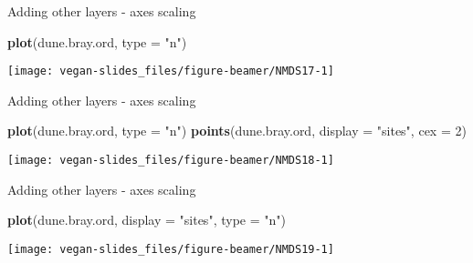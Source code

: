 \documentclass[10pt,ignorenonframetext,compress, aspectratio=169]{beamer}
\newenvironment{Shaded}{\begin{snugshade}}{\end{snugshade}}
\newcommand{\KeywordTok}[1]{\textcolor[rgb]{0.13,0.29,0.53}{\textbf{{#1}}}}
\newcommand{\DataTypeTok}[1]{\textcolor[rgb]{0.13,0.29,0.53}{{#1}}}
\newcommand{\DecValTok}[1]{\textcolor[rgb]{0.00,0.00,0.81}{{#1}}}
\newcommand{\StringTok}[1]{\textcolor[rgb]{0.31,0.60,0.02}{{#1}}}
\newcommand{\NormalTok}[1]{{#1}}
\begin{document}
\begin{frame}[fragile]{Adding other layers - axes scaling}

\scriptsize

\begin{Shaded}
\begin{Highlighting}[]
\KeywordTok{plot}\NormalTok{(dune.bray.ord, }\DataTypeTok{type =} \StringTok{"n"}\NormalTok{)}
\end{Highlighting}
\end{Shaded}

\begin{center}\texttt{[image: vegan-slides\_files/figure-beamer/NMDS17-1]} \end{center}

\normalsize

\end{frame}

\begin{frame}[fragile]{Adding other layers - axes scaling}

\scriptsize

\begin{Shaded}
\begin{Highlighting}[]
\KeywordTok{plot}\NormalTok{(dune.bray.ord, }\DataTypeTok{type =} \StringTok{"n"}\NormalTok{)}
\KeywordTok{points}\NormalTok{(dune.bray.ord, }\DataTypeTok{display =} \StringTok{"sites"}\NormalTok{, }\DataTypeTok{cex =} \DecValTok{2}\NormalTok{)}
\end{Highlighting}
\end{Shaded}

\begin{center}\texttt{[image: vegan-slides\_files/figure-beamer/NMDS18-1]} \end{center}

\normalsize

\end{frame}

\begin{frame}[fragile]{Adding other layers - axes scaling}

\scriptsize

\begin{Shaded}
\begin{Highlighting}[]
\KeywordTok{plot}\NormalTok{(dune.bray.ord, }\DataTypeTok{display =} \StringTok{"sites"}\NormalTok{, }\DataTypeTok{type =} \StringTok{"n"}\NormalTok{)}
\end{Highlighting}
\end{Shaded}

\begin{center}\texttt{[image: vegan-slides\_files/figure-beamer/NMDS19-1]} \end{center}

\normalsize

\end{frame}
\end{document}
